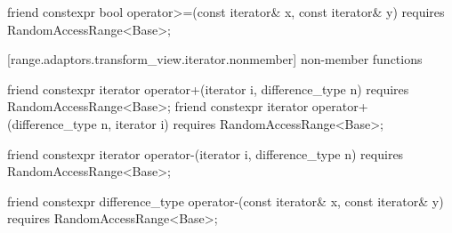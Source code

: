 {%
\begin{itemdecl}
friend constexpr bool operator>=(const iterator& x, const iterator& y)
  requires RandomAccessRange<Base>;
\end{itemdecl}

\begin{itemdescr}
\pnum
\oldtxt{\returns} 
\end{itemdescr}

[range.adaptors.transform_view.iterator.nonmember]{ non-member functions}

\begin{itemdecl}
friend constexpr iterator operator+(iterator i, difference_type n)
  requires RandomAccessRange<Base>;
friend constexpr iterator operator+(difference_type n, iterator i)
  requires RandomAccessRange<Base>;
\end{itemdecl}

\begin{itemdescr}
\pnum
\oldtxt{\returns} 
\end{itemdescr}

%
\begin{itemdecl}
friend constexpr iterator operator-(iterator i, difference_type n)
  requires RandomAccessRange<Base>;
\end{itemdecl}

\begin{itemdescr}
\pnum
\oldtxt{\returns} 
\end{itemdescr}

%
\begin{itemdecl}
friend constexpr difference_type operator-(const iterator& x, const iterator& y)
  requires RandomAccessRange<Base>;
\end{itemdecl}

\begin{itemdescr}
\pnum
\oldtxt{\returns} 
\end{itemdescr}

}
